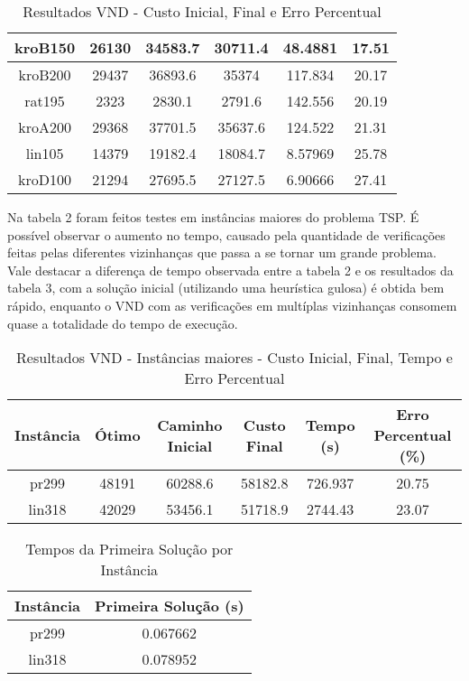 \documentclass[10pt]{extarticle} %
\begin{document}
\begin{table}[h]
\begin{tabular}{|c|c|c|c|c|c|}
         kroB150    & 26130    & 34583.7      & 30711.4    & 48.4881   & 17.51 \\ \hline
         kroB200    & 29437    & 36893.6      & 35374      & 117.834   & 20.17 \\ \hline
         rat195     & 2323     & 2830.1       & 2791.6     & 142.556   & 20.19 \\ \hline
         kroA200    & 29368    & 37701.5      & 35637.6    & 124.522   & 21.31 \\ \hline
         lin105     & 14379    & 19182.4      & 18084.7    & 8.57969   & 25.78 \\ \hline
         kroD100    & 21294    & 27695.5      & 27127.5    & 6.90666   & 27.41 \\ \hline
    \end{tabular}
    \caption{Resultados VND - Custo Inicial, Final e Erro Percentual}
    \label{tab:comparison_with_initial}
\end{table}

Na tabela 2 foram feitos testes em instâncias maiores do problema TSP. É possível observar o aumento no tempo, causado pela quantidade de verificações feitas pelas diferentes vizinhanças que passa a se tornar um grande problema. Vale destacar a diferença de tempo observada entre a tabela 2 e os resultados da tabela 3, com a solução inicial (utilizando uma heurística gulosa) é obtida bem rápido, enquanto o VND com as verificações em multíplas vizinhanças consomem quase a totalidade do tempo de execução.

\begin{table}[h]
    \centering
    \begin{tabular}{|c|c|c|c|c|c|} \hline 
         \textbf{Instância} & \textbf{Ótimo} & \textbf{Caminho Inicial} & \textbf{Custo Final} & \textbf{Tempo (s)} & \textbf{Erro Percentual (\%)}\\ \hline 
         pr299      & 48191    & 60288.6      & 58182.8    & 726.937   & 20.75  \\ \hline
         lin318     & 42029    & 53456.1      & 51718.9    & 2744.43   & 23.07  \\ \hline
    \end{tabular}
    \caption{Resultados VND - Instâncias maiores - Custo Inicial, Final, Tempo e Erro Percentual}
    \label{tab:comparison_with_initial}
\end{table}

\begin{table}[h]
    \centering
    \begin{tabular}{|c|c|} \hline 
         \textbf{Instância} & \textbf{Primeira Solução (s)} \\ \hline 
         pr299      & 0.067662 \\ \hline
         lin318     & 0.078952 \\ \hline
    \end{tabular}
    \caption{Tempos da Primeira Solução por Instância}
    \label{tab:first_solution_times}
\end{table}
\end{document}
